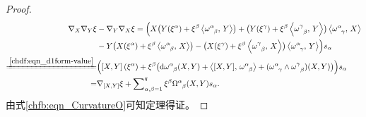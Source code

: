 \begin{proof}
\begin{align*}
    \nabla_X \nabla_Y \xi & -\nabla_Y \nabla_X \xi =
    \Bigl(      
     X \bigl(Y (\xi^\alpha )+ \xi^\beta \left< \omega_{\hphantom{\alpha}\beta}^\alpha,\, Y \right> \bigr)+ 
     \bigl(Y (\xi^\gamma )+ \xi^\beta \left< \omega_{\hphantom{\alpha}\beta}^\gamma,\, Y \right> \bigr)
     \left< \omega_{\hphantom{\alpha}\gamma}^\alpha,\, X \right> \\
    &-Y \bigl(X (\xi^\alpha )+ \xi^\beta \left< \omega_{\hphantom{\alpha}\beta}^\alpha,\, X \right> \bigr)-
    \bigl(X (\xi^\gamma )+ \xi^\beta \left< \omega_{\hphantom{\alpha}\beta}^\gamma,\, X \right> \bigr)
    \left< \omega_{\hphantom{\alpha}\gamma}^\alpha,\, Y \right>     \Bigr)s_\alpha \\
   \xlongequal{\ref{chdf:eqn_d1form-value}}&\Bigl( \left[X,Y\right](\xi^\alpha)
   +\xi^\beta \bigl( \mathrm{d}\omega_{\hphantom{\alpha}\beta}^\alpha (X,Y)
   +\left< [X,Y],\, \omega_{\hphantom{\alpha}\beta}^\alpha\right> 
   + (\omega_{\hphantom{\alpha}\gamma}^\alpha \wedge \omega_{\hphantom{\alpha}\beta}^\gamma)(X,Y)
    \bigr)  \Bigr)s_\alpha  \\
   =&\nabla_{[X,Y]} \xi + \sum\nolimits_{\alpha,\beta=1}^{q} 
   \xi^\beta \Omega_{\hphantom{\alpha}\beta}^\alpha (X,Y) s_\alpha .
\end{align*}
由式\eqref{chfb:eqn_CurvatureO}可知定理得证。
\end{proof}




